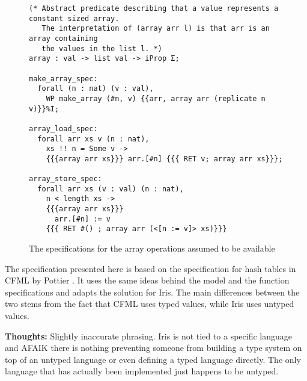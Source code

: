 \documentclass[10pt,a4paper]{article}
\renewcommand{\fcolorbox}[4][]{#4}}
\newcommand{\thoughts}[1]{\noindent\fcolorbox{black}{cyan}{\parbox{\textwidth}{\textbf{Thoughts:} \linebreak #1}}}
\begin{document}
\begin{figure}
\begin{verbatim}
(* Abstract predicate describing that a value represents a constant sized array.
   The interpretation of (array arr l) is that arr is an array containing
   the values in the list l. *)
array : val -> list val -> iProp Σ;

make_array_spec:
  forall (n : nat) (v : val),
    WP make_array (#n, v) {{arr, array arr (replicate n v)}}%I;

array_load_spec:
  forall arr xs v (n : nat),
    xs !! n = Some v ->
    {{{array arr xs}}} arr.[#n] {{{ RET v; array arr xs}}};

array_store_spec:
  forall arr xs (v : val) (n : nat),
    n < length xs ->
    {{{array arr xs}}}
      arr.[#n] := v
    {{{ RET #() ; array arr (<[n := v]> xs)}}}
\end{verbatim}
\caption{The specifications for the array operations assumed to be available}
\label{fig:arr_spec}
\end{figure}

The specification presented here is %
based on the specification for hash tables in CFML by Pottier \cite{pottier-cpp-17}. It uses the same ideas behind the model and the function specifications and adapts the solution for Iris. The main differences between the two stems from the fact that CFML uses typed values, while Iris uses untyped values.

\thoughts{Slightly inaccurate phrasing. Iris is not tied to a specific language and AFAIK there is nothing preventing someone from building a type system on top of an untyped language or even defining a typed language directly. The only language that has actually been implemented just happens to be untyped.}
\end{document}

